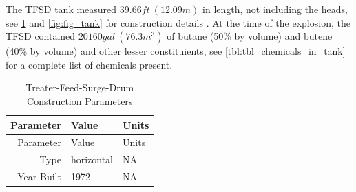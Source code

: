 \documentclass[10pt,parskip=half,
toc=sectionentrywithdots,
bibliography=totocnumbered,
captions=tableheading,numbers=noendperiod]{scrartcl}
\begin{document}
The TFSD tank measured \(39.66ft\:(12.09m)\) in length, not including
the heads, see \cref{tbl:tbl_tank} and \cref{fig:fig_tank} for
construction details \cite{PES2019}. At the time of the explosion, the
TFSD contained \(20160gal\:(76.3m^3)\) of butane (50\% by volume) and
butene (40\% by volume) and other lesser constituients, see
\cref{tbl:tbl_chemicals_in_tank} for a complete list of chemicals
present.

\begin{longtable}[]{@{}rll@{}}
\caption{Treater-Feed-Surge-Drum Construction Parameters \cite{PES2019}
\label{tbl:tbl_tank}}\tabularnewline
\toprule
\begin{minipage}[b]{0.23\columnwidth}\raggedleft
Parameter\strut
\end{minipage} & \begin{minipage}[b]{0.23\columnwidth}\raggedright
Value\strut
\end{minipage} & \begin{minipage}[b]{0.23\columnwidth}\raggedright
Units\strut
\end{minipage}\tabularnewline
\midrule
\endfirsthead
\toprule
\begin{minipage}[b]{0.23\columnwidth}\raggedleft
Parameter\strut
\end{minipage} & \begin{minipage}[b]{0.23\columnwidth}\raggedright
Value\strut
\end{minipage} & \begin{minipage}[b]{0.23\columnwidth}\raggedright
Units\strut
\end{minipage}\tabularnewline
\midrule
\endhead
\begin{minipage}[t]{0.23\columnwidth}\raggedleft
Type\strut
\end{minipage} & \begin{minipage}[t]{0.23\columnwidth}\raggedright
horizontal\strut
\end{minipage} & \begin{minipage}[t]{0.23\columnwidth}\raggedright
NA\strut
\end{minipage}\tabularnewline
\begin{minipage}[t]{0.23\columnwidth}\raggedleft
Year Built\strut
\end{minipage} & \begin{minipage}[t]{0.23\columnwidth}\raggedright
1972\strut
\end{minipage} & \begin{minipage}[t]{0.23\columnwidth}\raggedright
NA\strut
\end{minipage}\tabularnewline

\end{longtable}
\end{document}
